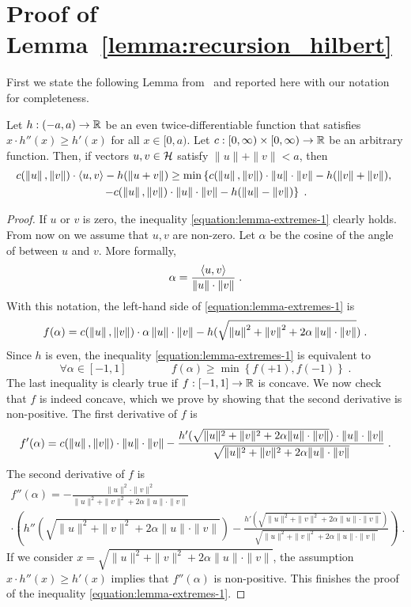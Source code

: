 \section{Proof of Lemma~\ref{lemma:recursion_hilbert}}
\label{section:hilbert-space-reduction}

First we state the following Lemma from~\cite{McMahan-Orabona-2014} and
reported here with our notation for completeness.

\begin{lemma}[Extremes]
\label{lemma:extremes}
Let $h:(-a,a) \to \mathbb{R}$ be an even twice-differentiable function that
satisfies $x \cdot h''(x) \ge h'(x)$ for all $x \in [0,a)$. Let $c:[0,\infty) \times [0, \infty) \to \mathbb{R}$
be an arbitrary function. Then, if vectors $u,v \in \mathcal{H}$ satisfy $\|u\| + \|v\| < a$, then
\begin{multline}
\label{equation:lemma-extremes-1}
c(\left\|{u}\right\|, \left\|{v}\right\|) \cdot \langle u, v \rangle - h(\left\|{u+v}\right\|)
\ge \min \left\{ c(\left\|{u}\right\|, \left\|{v}\right\|) \cdot \left\|{u}\right\| \cdot \left\|{v}\right\| - h(\left\|{v}\right\| + \left\|{v}\right\|), \right. \\
\left. - c(\left\|{u}\right\|, \left\|{v}\right\|) \cdot \left\|{u}\right\| \cdot \left\|{v}\right\| - h(\left\|{u}\right\| - \left\|{v}\right\|) \right\} \; .
\end{multline}
\end{lemma}
%
\begin{proof}
If $u$ or $v$ is zero, the inequality \eqref{equation:lemma-extremes-1} clearly
holds. From now on we assume that $u,v$ are non-zero. Let $\alpha$ be the cosine
of the angle of between $u$ and $v$. More formally,
\[
\alpha = \frac{\langle u, v \rangle}{\left\|{u}\right\| \cdot \left\|{v}\right\|} \; .
\]
With this notation, the left-hand side of \eqref{equation:lemma-extremes-1} is
\[
f(\alpha) = c(\left\|{u}\right\|, \left\|{v}\right\|) \cdot \alpha \left\|{u}\right\| \cdot \left\|{v}\right\| - h(\sqrt{\left\|{u}\right\|^2 + \left\|{v}\right\|^2 + 2 \alpha \left\|{u}\right\| \cdot \left\|{v}\right\|}) \; .
\]
Since $h$ is even, the inequality \eqref{equation:lemma-extremes-1} is equivalent to
\[
\forall \alpha \in [-1,1] \qquad \qquad f(\alpha) \ge \min \left\{f(+1), f(-1)\right\} \; .
\]
The last inequality is clearly true if $f:[-1,1] \to \mathbb{R}$ is concave. We now
check that $f$ is indeed concave, which we prove by showing that the second
derivative is non-positive. The first derivative of $f$ is
\[
f'(\alpha) = c(\left\|{u}\right\|, \left\|{v}\right\|) \cdot \|u\| \cdot \|v\| - \frac{h'(\sqrt{\|u\|^2 + \|v\|^2 + 2 \alpha \|u\| \cdot \|v\|}) \cdot \|u\| \cdot \|v\|}{\sqrt{\|u\|^2 + \|v\|^2 + 2 \alpha \|u\| \cdot \|v\|}} \; .
\]
The second derivative of $f$ is
\begin{multline*}
f''(\alpha) = - \frac{\|u\|^2 \cdot \|v\|^2}{\|u\|^2 + \|v\|^2 + 2 \alpha \|u\| \cdot \|v\|} \\
 \cdot \left( h''(\sqrt{\|u\|^2 + \|v\|^2 + 2 \alpha \|u\| \cdot \|v\|})  - \frac{h'(\sqrt{\|u\|^2 + \|v\|^2 + 2 \alpha \|u\| \cdot \|v\|})}{\sqrt{\|u\|^2 + \|v\|^2 + 2\alpha \|u\| \cdot \|v\|}}  \right) \; .
\end{multline*}
If we consider $x = \sqrt{\|u\|^2 + \|v\|^2 + 2 \alpha \|u\| \cdot \|v\|}$, the
assumption $x \cdot h''(x) \ge h'(x)$ implies that $f''(\alpha)$ is non-positive.
This finishes the proof of the inequality \eqref{equation:lemma-extremes-1}.
\end{proof}

